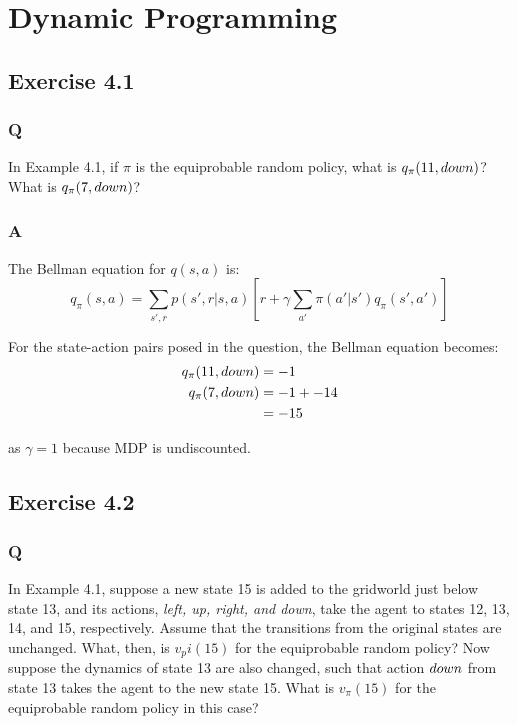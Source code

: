 \section{Dynamic Programming}

\subsection{Exercise 4.1}
\subsubsection{Q}
In Example 4.1, if $\pi$ is the equiprobable random policy, what is $q_\pi(11, \mathnormal{down})$? What is $q_\pi(7, \mathnormal{down})$? 
\subsubsection{A}
The Bellman equation for $q(s,a)$ is:
\begin{equation}
q_\pi(s,a) = \sum_{s',r} p(s', r | s, a) \left[r + \gamma \sum_{a'} \pi(a' | s') q_\pi(s', a')\right]
\end{equation}

For the state-action pairs posed in the question, the Bellman equation becomes:
\begin{align}
q_\pi(11, \mathnormal{down}) &= -1 \\
q_\pi(7, \mathnormal{down}) &= -1 + -14 \\
&= -15 \\
\end{align}

as $\gamma = 1$ because MDP is undiscounted.

\subsection{Exercise 4.2}
\subsubsection{Q}
In Example 4.1, suppose a new state 15 is added to the gridworld just below state 13, and its actions, \textit{left, up, right, and down}, take the agent to states 12, 13, 14, and 15, respectively. Assume that the transitions from the original states are unchanged. What, then, is $v_pi(15)$ for the equiprobable random policy? Now suppose the dynamics of state 13 are also changed, such that action $\mathnormal{down}$ from state 13 takes the agent to the new state 15. What is $v_\pi(15)$ for the equiprobable random policy in this case?
